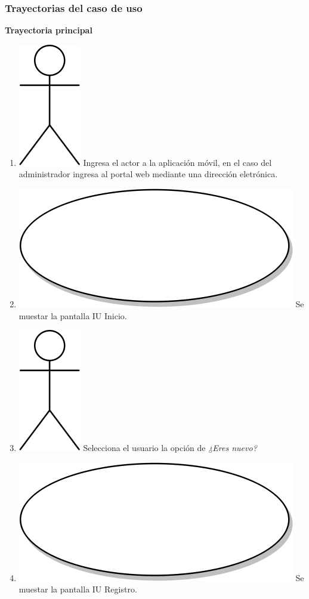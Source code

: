 \subsubsection{Trayectorias del caso de uso}
\textbf{Trayectoria principal}
\begin{enumerate}
  \item {\includegraphics[scale=.1]{Capitulo3/img/actor.png} Ingresa el actor a la aplicación móvil, en el caso del administrador ingresa al portal web mediante una dirección eletrónica.}
  \item {\includegraphics[scale=.05]{Capitulo3/img/proceso.png} Se muestar la pantalla IU Inicio.}
  \item {\includegraphics[scale=.1]{Capitulo3/img/actor.png} Selecciona el usuario la opción de \textit{¿Eres nuevo?}}
  \item {\includegraphics[scale=.05]{Capitulo3/img/proceso.png} Se muestar la pantalla IU Registro.}

\end{enumerate}
